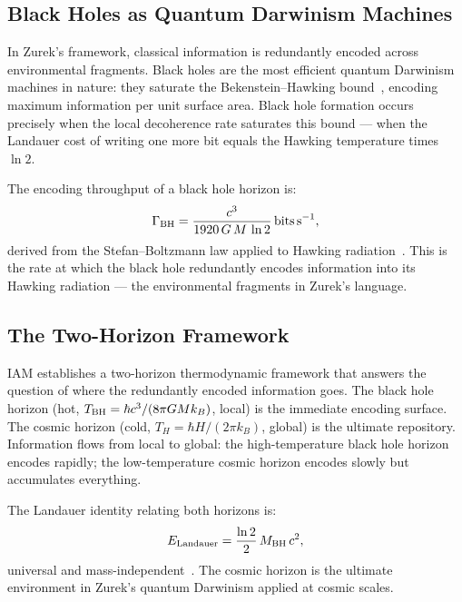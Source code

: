 \documentclass[12pt,a4paper]{article}
\begin{document}
\subsection{Black Holes as Quantum Darwinism Machines}

In Zurek's framework, classical information is redundantly encoded across
environmental fragments. Black holes are the most efficient quantum Darwinism
machines in nature: they saturate the Bekenstein--Hawking
bound~\citep{Bekenstein1973,Hawking1975}, encoding maximum information per
unit surface area. Black hole formation occurs precisely when the local
decoherence rate saturates this bound --- when the Landauer cost of writing
one more bit equals the Hawking temperature times $\ln 2$.

The encoding throughput of a black hole horizon is:
\begin{equation}
\Gamma_{\rm BH} = \frac{c^3}{1920\,G\,M\,\ln 2}\,\text{bits\,s}^{-1},
\label{eq:throughput}
\end{equation}
derived from the Stefan--Boltzmann law applied to Hawking
radiation~\citep{IAM_bh}. This is the rate at which the black hole
redundantly encodes information into its Hawking radiation --- the
environmental fragments in Zurek's language.

\subsection{The Two-Horizon Framework}

IAM establishes a two-horizon thermodynamic framework that answers the
question of where the redundantly encoded information goes. The black hole
horizon (hot, $T_{\rm BH} = \hbar c^3/(8\pi GM k_B)$, local) is the
immediate encoding surface. The cosmic horizon (cold, $T_H = \hbar H/(2\pi
k_B)$, global) is the ultimate repository. Information flows from local to
global: the high-temperature black hole horizon encodes rapidly; the
low-temperature cosmic horizon encodes slowly but accumulates everything.

The Landauer identity relating both horizons is:
\begin{equation}
E_{\rm Landauer} = \frac{\ln 2}{2}\,M_{\rm BH}\,c^2,
\label{eq:landauer_bh}
\end{equation}
universal and mass-independent~\citep{IAM_bh}. The cosmic horizon is the
ultimate environment in Zurek's quantum Darwinism applied at cosmic scales.

\end{document}
